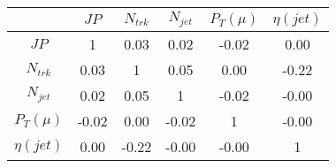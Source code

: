 \begin{tabular}{|c|c|c|c|c|c|} 
\hline
 & $JP$ & $N_{trk}$ & $N_{jet}$ & $P_{T} (\mu)$ & $\eta (jet)$ \\ \hline
$JP$ & 1 & 0.03 & 0.02 & -0.02 & 0.00 \\
$N_{trk}$ & 0.03 & 1 & 0.05 & 0.00 & -0.22 \\
$N_{jet}$ & 0.02 & 0.05 & 1 & -0.02 & -0.00 \\
$P_{T} (\mu)$ & -0.02 & 0.00 & -0.02 & 1 & -0.00 \\
$\eta (jet)$ & 0.00 & -0.22 & -0.00 & -0.00 & 1 \\
\hline 
\end{tabular} 



